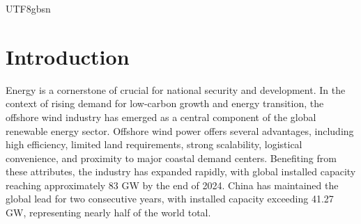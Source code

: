 \documentclass[%
 aip,
 amsmath,amssymb,
 reprint,%
]{revtex4-1}
\begin{document}
\begin{CJK*}{UTF8}{gbsn}
\begin{abstract}

\end{abstract}

\maketitle
\end{CJK*}

\section{Introduction}

Energy is a cornerstone of crucial for national security and development. In the context of rising demand for low-carbon growth and energy transition, the offshore wind industry has emerged as a central component of the global renewable energy sector. Offshore wind power offers several advantages, including high efficiency, limited land requirements, strong scalability, logistical convenience, and proximity to major coastal demand centers. Benefiting from these attributes, the industry has expanded rapidly, with global installed capacity reaching approximately 83 GW by the end of 2024. China has maintained the global lead for two consecutive years, with installed capacity exceeding 41.27 GW, representing nearly half of the world total.

\end{document}
